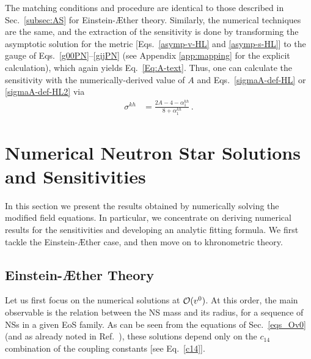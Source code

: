 \documentclass[prd,aps,twocolumn,nofootinbib,showpacs,superscriptaddress]{revtex4-1}
\def\kh{{kh}}
\begin{document}
The matching conditions and procedure are identical to
those described in Sec.~\ref{subsec:AS} for Einstein-\AE ther theory. Similarly, the numerical
techniques are the same, and the extraction of 
the sensitivity is done by transforming the asymptotic solution for the metric 
[Eqs.~\eqref{asymp-v-HL} and \eqref{asymp-s-HL}]
to the gauge of Eqs.~\eqref{g00PN}--\eqref{gijPN} 
(see Appendix \ref{app:mapping} for the explicit calculation), which again yields Eq.~\eqref{Eq:A-text}.
Thus, one can calculate the sensitivity with the numerically-derived value of $A$ and Eqs.~\eqref{sigmaA-def-HL} or \eqref{sigmaA-def-HL2} via
\begin{align}
\sigma^{\kh} &= \frac{2 A - 4 - \alpha_{1}^{\kh}}{8 + \alpha_{1}^{\kh}}\,.
\end{align}

\section{Numerical Neutron Star Solutions and Sensitivities}
\label{sec:numerical-results}

In this section we present the results obtained by numerically solving
the modified field equations. In particular, we concentrate on
deriving numerical results for the sensitivities and developing an
analytic fitting formula. We first tackle the Einstein-\AE ther 
case, and then move on to khronometric theory. 

\subsection{Einstein-\AE ther Theory}

Let us first focus on the numerical solutions at
${\cal{O}}(v^{0})$.  At this order, the main observable is
the relation between the NS mass and its radius, for a sequence of NSs
in a given EoS family.  As can be seen from the equations of Sec.~\ref{eqs_Ov0} (and as already noted in Ref.~\cite{Eling:2007xh}),
these solutions depend only on the $c_{14}$ combination of the coupling constants [see Eq.~\eqref{c14}].
\end{document}
